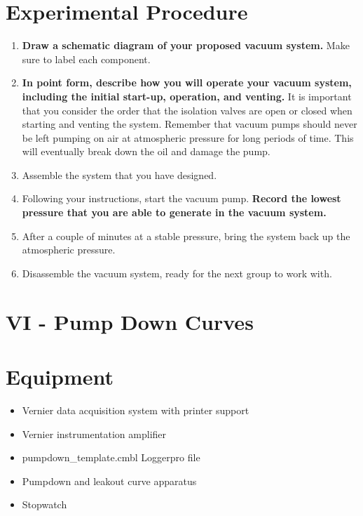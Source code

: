 \section{Experimental Procedure}
\begin{enumerate}
\item {\bf Draw a schematic diagram of your proposed vacuum system.}  Make sure to label each component.

\item {\bf In point form, describe how you will operate your vacuum system, including the initial start-up, operation, and venting.}  It is important that you consider the order that the isolation valves are open or closed when starting and venting the system.  Remember that vacuum pumps should never be left pumping on air at atmospheric pressure for long periods of time.  This will eventually break down the oil and damage the pump.

\item Assemble the system that you have designed.

\item Following your instructions, start the vacuum pump. {\bf Record the lowest pressure that you are able to generate in the vacuum system.}

\item After a couple of minutes at a stable pressure, bring the system back up the atmospheric pressure.

\item Disassemble the vacuum system, ready for the next group to work with.
\end{enumerate}

\section{VI - Pump Down Curves}

\section{Equipment}

\begin{minipage}[t]{0.5\textwidth}
\begin{itemize}[noitemsep]
\item Vernier data acquisition system with printer support
\item Vernier instrumentation amplifier
\item pumpdown\_template.cmbl Loggerpro file
\end{itemize}
\end{minipage}
\begin{minipage}[t]{0.5\textwidth}
\begin{itemize}[noitemsep]
\item Pumpdown and leakout curve apparatus
\item Stopwatch
\end{itemize}
\end{minipage}

